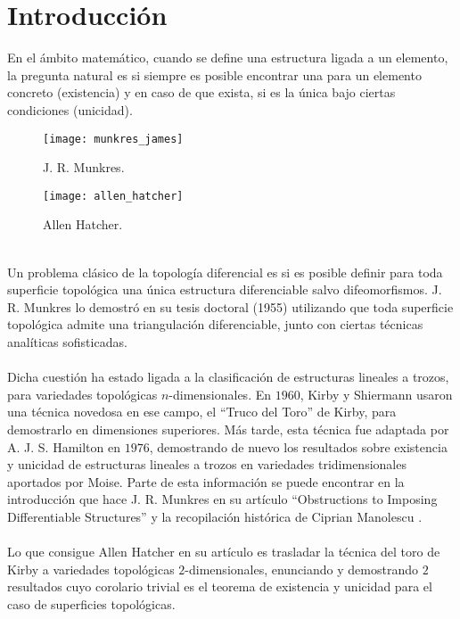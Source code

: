 %


\chapter{Introducción}

En el ámbito matemático, cuando se define una estructura ligada a un elemento, la pregunta natural es si siempre es posible encontrar una para un elemento concreto (existencia) y en caso de que exista, si es la única bajo ciertas condiciones (unicidad).\\
\begin{wrapfigure}{r}{3cm}
	\texttt{[image: munkres\_james]}
	\caption*{J. R. Munkres.}\label{wrap-fig:munkres_james}
	\vspace{2.2cm}
	\texttt{[image: allen\_hatcher]}
	\caption*{Allen Hatcher.}\label{wrap-fig:allen_hatcher}
\end{wrapfigure} 
\\Un problema clásico de la topología diferencial es si es posible definir para toda superficie topológica una única estructura diferenciable salvo difeomorfismos. J. R. Munkres lo demostró en su tesis doctoral (1955) utilizando que toda superficie topológica admite una triangulación diferenciable, junto con ciertas técnicas analíticas sofisticadas.\\
\\Dicha cuestión ha estado ligada a la clasificación de estructuras lineales a trozos, para variedades topológicas $n$-dimensionales. En $1960$, Kirby y Shiermann usaron una técnica novedosa en ese campo, el ``Truco del Toro'' de Kirby, para demostrarlo en dimensiones superiores. Más tarde, esta técnica fue adaptada por A. J. S. Hamilton en $1976$, demostrando de nuevo los resultados sobre existencia y unicidad de estructuras lineales a trozos en variedades tridimensionales aportados por Moise. Parte de esta información se puede encontrar en la introducción que hace J. R. Munkres en su artículo ``Obstructions to Imposing Differentiable Structures'' \cite{Munkres} y la recopilación histórica de Ciprian Manolescu \cite{Historical}.\\
\\Lo que consigue Allen Hatcher en su artículo \cite{arXiv:1312.3518} es trasladar la técnica del toro de Kirby a variedades topológicas $2$-dimensionales, enunciando y demostrando $2$ resultados cuyo corolario trivial es el teorema de existencia y unicidad para el caso de superficies topológicas.\\
